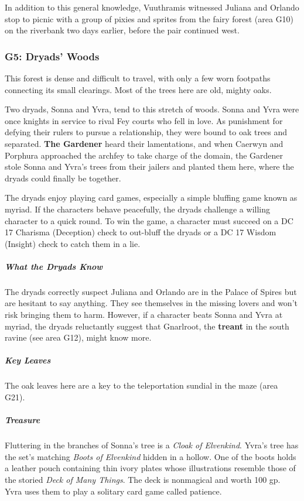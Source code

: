 \documentclass[10pt,a4paper,twoside,bg=print,twocolumn,openany,nodeprecatedcode]{dndbook}
\begin{document}
In addition to this general knowledge, Vuuthramis witnessed Juliana and Orlando stop to picnic with a group of pixies and sprites from the fairy forest (area G10) on the riverbank two days earlier, before the pair continued west.

\subsubsection{G5: Dryads' Woods}
\begin{DndReadAloud}{}
This forest is dense and difficult to travel, with only a few worn footpaths connecting its small clearings. Most of the trees here are old, mighty oaks.

\end{DndReadAloud}

Two dryads, Sonna and Yvra, tend to this stretch of woods. Sonna and Yvra were once knights in service to rival Fey courts who fell in love. As punishment for defying their rulers to pursue a relationship, they were bound to oak trees and separated. \textbf{The Gardener} heard their lamentations, and when Caerwyn and Porphura approached the archfey to take charge of the domain, the Gardener stole Sonna and Yvra's trees from their jailers and planted them here, where the dryads could finally be together.

The dryads enjoy playing card games, especially a simple bluffing game known as myriad. If the characters behave peacefully, the dryads challenge a willing character to a quick round. To win the game, a character must succeed on a DC 17 Charisma (Deception) check to out-bluff the dryads or a DC 17 Wisdom (Insight) check to catch them in a lie.

\subparagraph{What the Dryads Know}
The dryads correctly suspect Juliana and Orlando are in the Palace of Spires but are hesitant to say anything. They see themselves in the missing lovers and won't risk bringing them to harm. However, if a character beats Sonna and Yvra at myriad, the dryads reluctantly suggest that Gnarlroot, the \textbf{treant} in the south ravine (see area G12), might know more.

\subparagraph{Key Leaves}
The oak leaves here are a key to the teleportation sundial in the maze (area G21).

\subparagraph{Treasure}
Fluttering in the branches of Sonna's tree is a \textit{Cloak of Elvenkind}. Yvra's tree has the set's matching \textit{Boots of Elvenkind} hidden in a hollow. One of the boots holds a leather pouch containing thin ivory plates whose illustrations resemble those of the storied \textit{Deck of Many Things}. The deck is nonmagical and worth 100 gp. Yvra uses them to play a solitary card game called patience.
\end{document}
